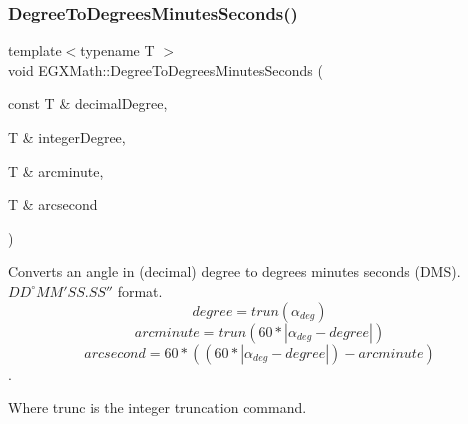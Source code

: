 \subsubsection{\texorpdfstring{Degree\+To\+Degrees\+Minutes\+Seconds()}{DegreeToDegreesMinutesSeconds()}}
{\footnotesize\ttfamily template$<$typename T $>$ \\
void E\+G\+X\+Math\+::\+Degree\+To\+Degrees\+Minutes\+Seconds (\begin{DoxyParamCaption}\item[{const T \&}]{decimal\+Degree,  }\item[{T \&}]{integer\+Degree,  }\item[{T \&}]{arcminute,  }\item[{T \&}]{arcsecond }\end{DoxyParamCaption})}



Converts an angle in (decimal) degree to degrees minutes seconds (D\+MS). ${DD}^{\circ}{MM}'{SS.SS}''$ format. \[degree=trun(\alpha_{deg})\] \[arcminute=trun(60 * |\alpha_{deg} - degree|)\] \[arcsecond=60 * ((60 * |\alpha_{deg} - degree|)-arcminute)\]. 

Where trunc is the integer truncation command.

